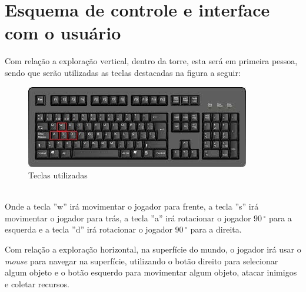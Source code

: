 \documentclass[11pt]{article} %
\begin{document}
\section{Esquema de controle e interface com o usuário}
Com relação a exploração vertical, dentro da torre, esta será em primeira pessoa, sendo que serão utilizadas as teclas destacadas na figura a seguir:\\
\begin{figure}[!htp]
\centering
\includegraphics[scale=0.75]{imagens/teclado.jpg}
\caption{Teclas utilizadas}
\label{Teclado}
\end{figure}
\\Onde a tecla ''w'' irá movimentar o jogador para frente, a tecla ''s'' irá movimentar o jogador para trás, a tecla ''a'' irá rotacionar o jogador $90\,^{\circ}$ para a esquerda e a tecla ''d'' irá rotacionar o jogador $90\,^{\circ}$ para a direita.

Com relação a exploração horizontal, na superfície do mundo, o jogador irá usar o \textit{mouse} para navegar na superfície, utilizando o botão direito para selecionar algum objeto e o botão esquerdo para movimentar algum objeto, atacar inimigos e coletar recursos.
\end{document}
